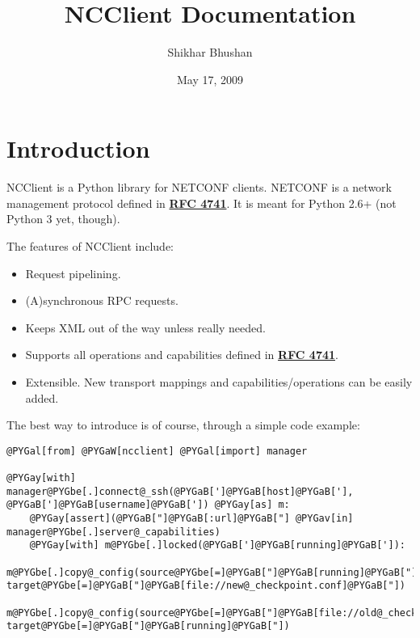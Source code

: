 \documentclass[a4paper,10pt,english]{manual}
\title{NCClient Documentation}
\date{May 17, 2009}
\author{Shikhar Bhushan}
\begin{document}
\maketitle
\tableofcontents



\resetcurrentobjects
\hypertarget{--doc-intro}{}

\chapter{Introduction}

NCClient is a Python library for NETCONF clients. NETCONF is a network management protocol defined in \href{http://tools.ietf.org/html/rfc4741.html}{\textbf{RFC 4741}}. It is meant for Python 2.6+ (not Python 3 yet, though).

The features of NCClient include:
\begin{itemize}
\item {} 
Request pipelining.

\item {} 
(A)synchronous RPC requests.

\item {} 
Keeps XML out of the way unless really needed.

\item {} 
Supports all operations and capabilities defined in \href{http://tools.ietf.org/html/rfc4741.html}{\textbf{RFC 4741}}.

\item {} 
Extensible. New transport mappings and capabilities/operations can be easily added.

\end{itemize}

The best way to introduce is of course, through a simple code example:

\begin{Verbatim}[commandchars=@\[\]]
@PYGal[from] @PYGaW[ncclient] @PYGal[import] manager

@PYGay[with] manager@PYGbe[.]connect@_ssh(@PYGaB[']@PYGaB[host]@PYGaB['], @PYGaB[']@PYGaB[username]@PYGaB[']) @PYGay[as] m:
    @PYGay[assert](@PYGaB["]@PYGaB[:url]@PYGaB["] @PYGav[in] manager@PYGbe[.]server@_capabilities)
    @PYGay[with] m@PYGbe[.]locked(@PYGaB[']@PYGaB[running]@PYGaB[']):
        m@PYGbe[.]copy@_config(source@PYGbe[=]@PYGaB["]@PYGaB[running]@PYGaB["], target@PYGbe[=]@PYGaB["]@PYGaB[file://new@_checkpoint.conf]@PYGaB["])
        m@PYGbe[.]copy@_config(source@PYGbe[=]@PYGaB["]@PYGaB[file://old@_checkpoint.conf]@PYGaB["], target@PYGbe[=]@PYGaB["]@PYGaB[running]@PYGaB["])
\end{Verbatim}
\end{document}
